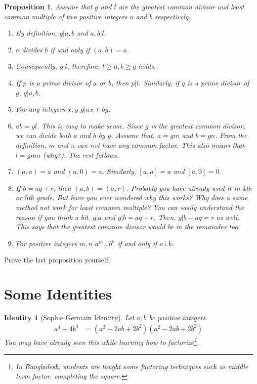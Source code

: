 \documentclass[a4paper, leqno]{article}
\newtheorem{proposition}{Proposition}
\newtheorem{identity}{Identity}
\theoremstyle{definition}
\theoremstyle{remark}
\begin{document}
			\begin{proposition}
				Assume that $g$ and $l$ are the greatest common divisor and least common multiple of two positive integers $a$ and $b$ respectively.
					\begin{enumerate}
						\item By definition, $g|a,b$ and $a,b|l$.
						\item $a$ divides $b$ if and only if $(a,b)=a$.
						\item Consequently, $g|l$, therefore, $l\geq a,b\geq g$ holds.
						\item If $p$ is a prime divisor of $a$ or $b$, then $p|l$. Similarly, if $q$ is a prime divisor of $g$, $q|a,b$.
						\item For any integers $x,y$ $g|ax+by$.
						\item $ab=gl$.
						{\normalfont This is easy to make sense. Since $g$ is the greatest common divisor, we can divide both $a$ and $b$ by $g$. Assume that, $a=gm$ and $b=gn$. From the definition, $m$ and $n$ can not have any common factor. This also means that $l=gmn$ (why?). The rest follows.}
						\item $(a,a)=a$ and $(a,0)=a$. Similarly, $[a,a]=a$ and $[a,0]=0$.
						\item[Euclidean Algorithm] If $b=aq+r$, then $(a,b)=(a,r)$.
						{\normalfont Probably you have already used it in $4$th or $5$th grade. But have you ever wondered why this works? Why does a same method not work for least common multiple? You can easily understand the reason if you think a bit. $g|a$ and $g|b=aq+r$. Then, $g|b-aq=r$ as well. This says that the greatest common divisor would be in the remainder too.}
						\item For positive integers $m,n$ $a^m\bot b^n$ if and only if $a\bot b$.
					\end{enumerate}
			\end{proposition}
		Prove the last proposition yourself.
		\section{Some Identities}
			\begin{identity}[Sophie Germain Identity]
				Let $a,b$ be positive integers.
					\begin{align*}
						a^4+4b^4 & = (a^2+2ab+2b^2)(a^2-2ab+2b^2)
					\end{align*}
				You may have already seen this while learning how to factorize\footnote{In Bangladesh, students are taught some factoring techniques such as \textit{middle term factor, completing the square}.}.
			\end{identity}
			
\end{document}
